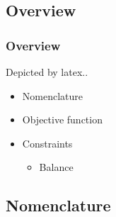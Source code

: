 \documentclass[
	11pt, %
	aspectratio=169, %
]{beamer}
\begin{document}
\subsection{Overview}

\begin{frame}
	\frametitle{Overview}
	Depicted by latex..
	\begin{itemize}
		\item Nomenclature
		\item Objective function
		\item Constraints
			\begin{itemize}
				\item Balance
			\end{itemize}
	\end{itemize}
\end{frame}


\subsection{Nomenclature}
\end{document}
